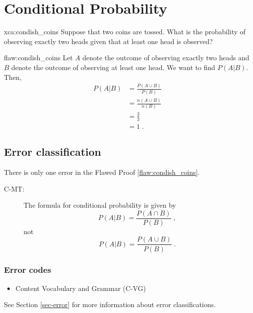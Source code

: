 \section{Conditional Probability}

\begin{xca}{xca:condish_coins}
Suppose that two coins are tossed. What is the probability of observing exactly two heads given that at least one head is observed?  
\end{xca}

\begin{flaw}{flaw:condish_coins} %
Let $A$ denote the outcome of observing exactly two heads and $B$ denote the outcome of observing at least one head. We want to find $P(A|B).$ Then,
\begin{align*}
    P(A|B) &= \frac{P(A \cup B)}{P(B)} \\
    &= \frac{n(A \cup B)}{n(B)} \\
    &= \frac{3}{3} \\
    &= 1\;.
\end{align*}
\end{flaw}

\clearpage
\subsection{Error classification}


There %
 is only one error %
 in the Flawed Proof \ref{flaw:condish_coins}. %

 
 \begin{description}
 	\item[C-MT:] The formula for conditional probability is given by $$P(A|B) = \frac{P(A \cap B)}{P(B)}\;,$$ not $$P(A|B) = \frac{P(A \cup B)}{P(B)}\;.$$
 \end{description}

 
\subsubsection{Error codes}
\begin{itemize}
	\item 	Content Vocabulary and Grammar (C-VG)
\end{itemize}
See Section \ref{sec-error} for more information about error classifications.

